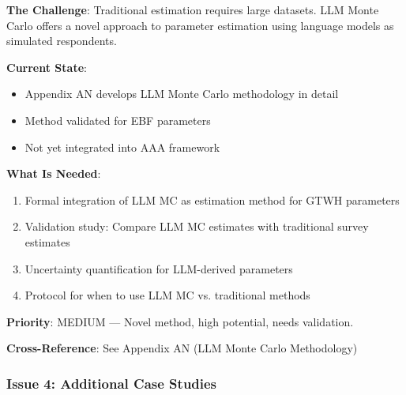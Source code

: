 \begin{tcolorbox}[colback=yellow!5!white, colframe=yellow!75!black, title=Status: Developed Separately]
\textbf{The Challenge}: Traditional estimation requires large datasets. LLM Monte 
Carlo offers a novel approach to parameter estimation using language models as 
simulated respondents.

\textbf{Current State}: 
\begin{itemize}[nosep]
\item Appendix AN develops LLM Monte Carlo methodology in detail
\item Method validated for EBF parameters
\item Not yet integrated into AAA framework
\end{itemize}

\textbf{What Is Needed}:
\begin{enumerate}
\item Formal integration of LLM MC as estimation method for GTWH parameters
\item Validation study: Compare LLM MC estimates with traditional survey estimates
\item Uncertainty quantification for LLM-derived parameters
\item Protocol for when to use LLM MC vs. traditional methods
\end{enumerate}

\textbf{Priority}: \colorbox{yellow!20}{MEDIUM} --- Novel method, high potential, needs validation.

\textbf{Cross-Reference}: See Appendix AN (LLM Monte Carlo Methodology)
\end{tcolorbox}

\subsubsection{Issue 4: Additional Case Studies}

